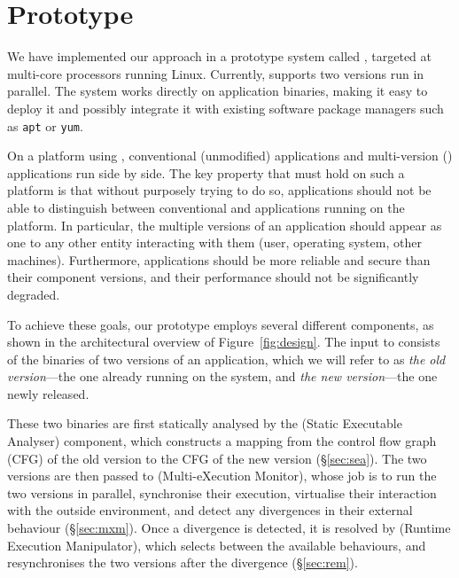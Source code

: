 \section{Prototype}
\label{sec:mx}


We have implemented our approach in a prototype system called \mx,
targeted at multi-core processors running Linux.  Currently, \mx
supports two versions run in parallel. The system works directly on
application binaries, making it easy to deploy it and possibly integrate
it with existing software package managers such as \texttt{apt} or
\texttt{yum}.

On a platform using \mx, conventional (\ie unmodified) applications
and multi-version (\mv) applications run side by side.  The key
property that must hold on such a platform is that without purposely
trying to do so, applications should not be able to distinguish
between conventional and \mv applications running on the platform. In
particular, the multiple versions of an \mv application should appear
as one to any other entity interacting with them (\eg user, operating
system, other machines).  Furthermore, \mv applications should be more
reliable and secure than their component versions, and their
performance should not be significantly degraded.

To achieve these goals, our prototype \mx employs several different
components, as shown in the architectural overview of
Figure~\ref{fig:design}.  The input to \mx consists of the binaries of
two versions of an application, which we will refer to as 
\textit{the old version}---the one already running on the system, and 
\textit{the new version}---the one newly released.


These two binaries are first statically analysed by the \sea (Static
Executable Analyser) component, which constructs a mapping from the
control flow graph (CFG) of the old version to the CFG of the new
version (\S\ref{sec:sea}).  The two versions are then passed to \mxm
(Multi-eXecution Monitor), whose job is to run the two versions in
parallel, synchronise their execution, virtualise their interaction
with the outside environment, and detect any divergences in their
external behaviour (\S\ref{sec:mxm}).  Once a divergence is detected,
it is resolved by \rem (Runtime Execution Manipulator), which selects
between the available behaviours, and resynchronises the two versions
after the divergence (\S\ref{sec:rem}).

